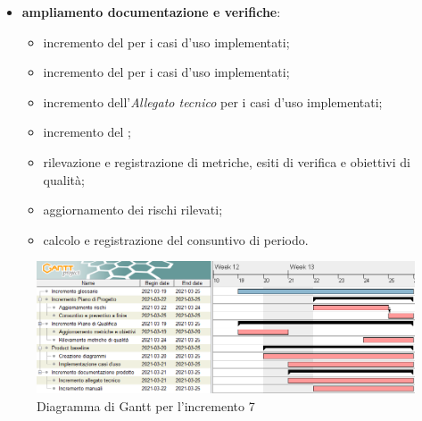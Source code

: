 \begin{itemize}
\begin{itemize}
\end{itemize}

\item \textbf{ampliamento documentazione e verifiche}:
\begin{itemize}
\item incremento del \MU{} per i casi d'uso implementati;
\item incremento del \MM{} per i casi d'uso implementati;
\item incremento dell'\textit{Allegato tecnico} per i casi d'uso implementati;
\item incremento del ;
\item rilevazione e registrazione di metriche, esiti di verifica e obiettivi di qualità;
\item aggiornamento dei rischi rilevati;
\item calcolo e registrazione del consuntivo di periodo.
\end{itemize}

\end{itemize}
\begin{figure}[H]
\centering

\centerline{\includegraphics[scale=0.6]{res/Pianificazione/Fasi/CodificaIncrementi/ganttIncremento7}}
\caption{Diagramma di Gantt per l'incremento 7}
\end{figure}